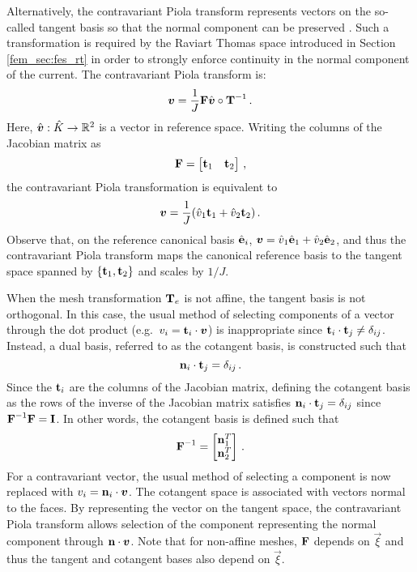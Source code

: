 \documentclass[../doc.tex]{subfiles}
\begin{document}
Alternatively, the contravariant Piola transform represents vectors on the so-called tangent basis so that the normal component can be preserved \cite{ciarlet_elasticity,piola_cisc}. Such a transformation is required by the Raviart Thomas space introduced in Section \ref{fem_sec:fes_rt} in order to strongly enforce continuity in the normal component of the current. The contravariant Piola transform is: 
	\begin{equation} \label{fem:piola}
		\boldsymbol{v} = \frac{1}{J}\boldsymbol{\mathrm{F}}\hat{\boldsymbol{v}}\circ\boldsymbol{\mathrm{T}}^{-1} \,. 
	\end{equation}
Here, $\hat{\boldsymbol{v}} : \hat{K} \rightarrow \mathbb{R}^2$ is a vector in reference space. 
Writing the columns of the Jacobian matrix as 
	\begin{equation}
		\boldsymbol{\mathrm{F}} = \begin{bmatrix} 
			\boldsymbol{\mathrm{t}}_1 & \boldsymbol{\mathrm{t}}_2 
		\end{bmatrix} \,,
	\end{equation}
the contravariant Piola transformation is equivalent to
	\begin{equation}
		\boldsymbol{v} = \frac{1}{J}(\hat{v}_1 \boldsymbol{\mathrm{t}}_1 + \hat{v}_2 \boldsymbol{\mathrm{t}}_2) \,.
	\end{equation}
Observe that, on the reference canonical basis $\hat{\boldsymbol{\mathrm{e}}}_i$, $\boldsymbol{v} = \hat{v}_1 \hat{\boldsymbol{\mathrm{e}}}_1 + \hat{v}_2 \hat{\boldsymbol{\mathrm{e}}}_2$, and thus the contravariant Piola transform maps the canonical reference basis to the tangent space spanned by $\{\boldsymbol{\mathrm{t}}_1,\boldsymbol{\mathrm{t}}_2\}$ and scales by $1/J$. 

When the mesh transformation $\boldsymbol{\mathrm{T}}_e$ is not affine, the tangent basis is not orthogonal. In this case, the usual method of selecting components of a vector through the dot product (e.g.~$v_i = \boldsymbol{\mathrm{t}}_i \cdot \boldsymbol{v}$) is inappropriate since $\boldsymbol{\mathrm{t}}_i \cdot \boldsymbol{\mathrm{t}}_j \neq \delta_{ij}$. Instead, a dual basis, referred to as the cotangent basis, is constructed such that 
	\begin{equation}
		\boldsymbol{\mathrm{n}}_i \cdot \boldsymbol{\mathrm{t}}_j = \delta_{ij} \,. 
	\end{equation}
Since the $\boldsymbol{\mathrm{t}}_i$ are the columns of the Jacobian matrix, defining the cotangent basis as the rows of the inverse of the Jacobian matrix satisfies $\boldsymbol{\mathrm{n}}_i \cdot \boldsymbol{\mathrm{t}}_j = \delta_{ij}$ since $\boldsymbol{\mathrm{F}}^{-1}\boldsymbol{\mathrm{F}} = \boldsymbol{\mathrm{I}}$. In other words, the cotangent basis is defined such that 
	\begin{equation}
		\boldsymbol{\mathrm{F}}^{-1} = \begin{bmatrix} 
			\boldsymbol{\mathrm{n}}_1^T \\ \boldsymbol{\mathrm{n}}_2^T 
		\end{bmatrix} \,. 
	\end{equation}
For a contravariant vector, the usual method of selecting a component is now replaced with $v_i = \boldsymbol{\mathrm{n}}_i \cdot \boldsymbol{v}$. 
The cotangent space is associated with vectors normal to the faces. By representing the vector on the tangent space, the contravariant Piola transform allows selection of the component representing the normal component through $\boldsymbol{\mathrm{n}}\cdot\boldsymbol{v}$. 
Note that for non-affine meshes, $\boldsymbol{\mathrm{F}}$ depends on $\vec{\xi}$ and thus the tangent and cotangent bases also depend on $\vec{\xi}$. 
\end{document}
